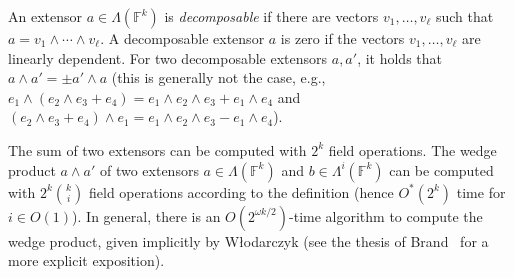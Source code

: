 \documentclass[10pt,a4paper]{article}
\newcommand{\F}{\ensuremath{\mathbb F}\xspace}
\begin{document}
An extensor $a \in \Lambda(\F^k)$ is \emph{decomposable} if there are vectors $v_1, \dots, v_{\ell}$ such that $a = v_1 \wedge \cdots \wedge v_{\ell}$.
A decomposable extensor $a$ is zero if the vectors $v_1, \dots, v_{\ell}$ are linearly dependent.
For two decomposable extensors $a, a'$, it holds that $a \wedge a' = \pm a' \wedge a$ (this is generally not the case, e.g., $e_1 \wedge (e_2 \wedge e_3 +  e_4) = e_1 \wedge e_2 \wedge e_3 + e_1 \wedge e_4$ and $(e_2 \wedge e_3 +  e_4) \wedge e_1 = e_1 \wedge e_2 \wedge e_3 - e_1 \wedge e_4$).

The sum of two extensors can be computed with $2^{k}$ field operations.
The wedge product $a \wedge a'$ of two extensors $a \in \Lambda(\F^k)$ and $b \in \Lambda^i(\F^k)$ can be computed with $2^k \binom{k}{i}$ field operations according to the definition (hence $O^*(2^k)$ time for $i \in O(1)$).
In general, there is an $O(2^{\omega k / 2})$-time algorithm to compute the wedge product, given implicitly by W\l{}odarczyk \cite{Wlodarczyk19} (see the thesis of Brand~\cite{Brand19thesis} for a more explicit exposition).
\end{document}
